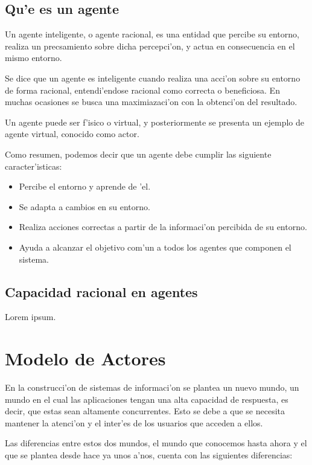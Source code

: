 \documentclass[12pt]{article}
\begin{document}
\subsection{Qu'e es un agente}
\label{sub:que es un agente}
Un agente inteligente, o agente racional, es una entidad que percibe su entorno, realiza
un precsamiento sobre dicha percepci'on, y actua en consecuencia en el mismo entorno.

Se dice que un agente es inteligente cuando realiza una acci'on sobre su entorno de forma racional,
entendi'endose racional como correcta o beneficiosa. En muchas ocasiones se busca una
maximiazaci'on con la obtenci'on del resultado.

Un agente puede ser f'isico o virtual, y posteriormente se presenta un ejemplo de agente virtual,
conocido como actor.

Como resumen, podemos decir que un agente debe cumplir las siguiente caracter'isticas:

\begin{itemize}
	\item Percibe el entorno y aprende de 'el.
	\item Se adapta a cambios en su entorno.
	\item Realiza acciones correctas a partir de la informaci'on percibida de su entorno.
	\item Ayuda a alcanzar el objetivo com'un a todos los agentes que componen el sistema.
\end{itemize}

\subsection{Capacidad racional en agentes}
\label{sub:capacidad racional en agentes}
Lorem ipsum.
\section{Modelo de Actores}
\label{sec:modelos de actores}
En la construcci'on de sistemas de informaci'on se plantea un nuevo mundo, un mundo en el cual
las aplicaciones tengan una alta capacidad de respuesta, es decir, que estas sean altamente concurrentes.
Esto se debe a que se necesita mantener la atenci'on y el inter'es de los usuarios que acceden a ellos.

Las diferencias entre estos dos mundos, el mundo que conocemos hasta ahora y el que se plantea
desde hace ya unos a'nos, cuenta con las siguientes diferencias:
\end{document}
